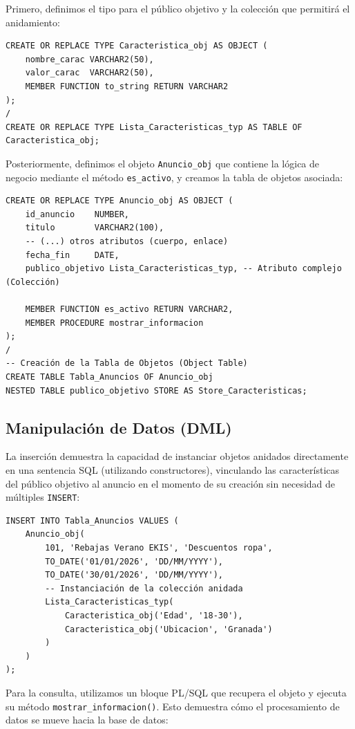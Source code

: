 Primero, definimos el tipo para el público objetivo y la colección que permitirá el anidamiento:

\begin{verbatim}
CREATE OR REPLACE TYPE Caracteristica_obj AS OBJECT (
    nombre_carac VARCHAR2(50),
    valor_carac  VARCHAR2(50),
    MEMBER FUNCTION to_string RETURN VARCHAR2
);
/
CREATE OR REPLACE TYPE Lista_Caracteristicas_typ AS TABLE OF Caracteristica_obj;
\end{verbatim}

Posteriormente, definimos el objeto \texttt{Anuncio\_obj} que contiene la lógica de negocio mediante el método \texttt{es\_activo}, y creamos la tabla de objetos asociada:

\begin{verbatim}
CREATE OR REPLACE TYPE Anuncio_obj AS OBJECT (
    id_anuncio    NUMBER,
    titulo        VARCHAR2(100),
    -- (...) otros atributos (cuerpo, enlace)
    fecha_fin     DATE,
    publico_objetivo Lista_Caracteristicas_typ, -- Atributo complejo (Colección)

    MEMBER FUNCTION es_activo RETURN VARCHAR2,
    MEMBER PROCEDURE mostrar_informacion
);
/
-- Creación de la Tabla de Objetos (Object Table)
CREATE TABLE Tabla_Anuncios OF Anuncio_obj
NESTED TABLE publico_objetivo STORE AS Store_Caracteristicas;
\end{verbatim}

\subsection{Manipulación de Datos (DML)}

La inserción demuestra la capacidad de instanciar objetos anidados directamente en una sentencia SQL (utilizando constructores), vinculando las características del público objetivo al anuncio en el momento de su creación sin necesidad de múltiples \texttt{INSERT}:

\begin{verbatim}
INSERT INTO Tabla_Anuncios VALUES (
    Anuncio_obj(
        101, 'Rebajas Verano EKIS', 'Descuentos ropa',
        TO_DATE('01/01/2026', 'DD/MM/YYYY'),
        TO_DATE('30/01/2026', 'DD/MM/YYYY'),
        -- Instanciación de la colección anidada
        Lista_Caracteristicas_typ(
            Caracteristica_obj('Edad', '18-30'),
            Caracteristica_obj('Ubicacion', 'Granada')
        )
    )
);
\end{verbatim}

Para la consulta, utilizamos un bloque PL/SQL que recupera el objeto y ejecuta su método \texttt{mostrar\_informacion()}. Esto demuestra cómo el procesamiento de datos se mueve hacia la base de datos:

